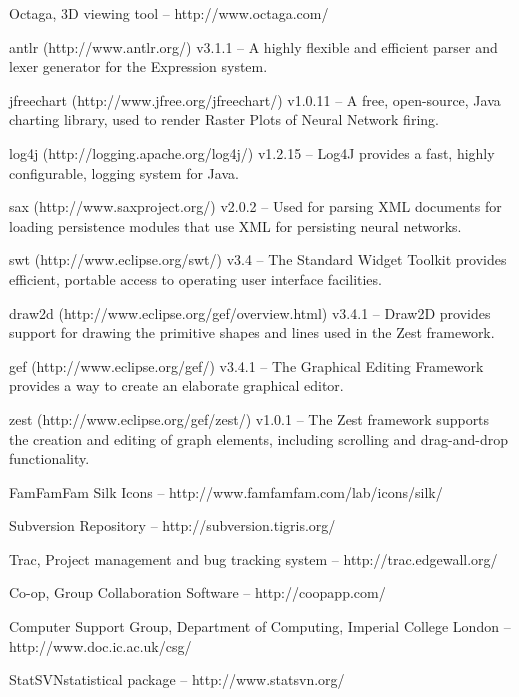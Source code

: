 \documentclass{acm_proc_article-sp}
\begin{document}
\begin{thebibliography}{99}
Octaga, 3D viewing tool {--} http://www.octaga.com/






antlr (http://www.antlr.org/) v3.1.1 {--} A highly flexible and efficient parser and lexer generator for the Expression system.

jfreechart (http://www.jfree.org/jfreechart/) v1.0.11 {--} A free, open-source, Java charting library, used to render Raster Plots of Neural Network firing.

log4j (http://logging.apache.org/log4j/) v1.2.15 {--} Log4J provides a fast, highly configurable, logging system for Java.

sax (http://www.saxproject.org/) v2.0.2 {--} Used for parsing XML documents for loading persistence modules that use XML for persisting neural networks.

swt (http://www.eclipse.org/swt/) v3.4 {--} The Standard Widget Toolkit provides efficient, portable access to operating user interface facilities.

draw2d (http://www.eclipse.org/gef/overview.html) v3.4.1 {--} Draw2D provides support for drawing the primitive shapes and lines used in the Zest framework.

gef (http://www.eclipse.org/gef/) v3.4.1 {--} The Graphical Editing Framework provides a way to create an elaborate graphical editor.

zest (http://www.eclipse.org/gef/zest/) v1.0.1 {--} The Zest framework supports the creation and editing of graph elements, including scrolling and drag-and-drop functionality.

FamFamFam Silk Icons {--} http://www.famfamfam.com/lab/icons/silk/

Subversion Repository {--} http://subversion.tigris.org/

Trac, Project management and bug tracking system {--} http://trac.edgewall.org/

Co-op, Group Collaboration Software {--} http://coopapp.com/

Computer Support Group, Department of Computing, Imperial College London {--} http://www.doc.ic.ac.uk/csg/

StatSVNstatistical package {--} http://www.statsvn.org/

\end{thebibliography}
\end{document}
